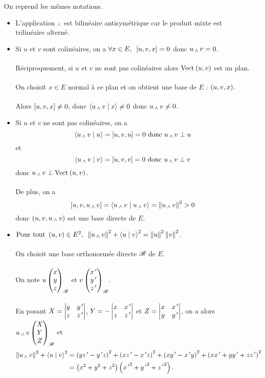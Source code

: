 \begin{dem}
On reprend les mêmes notations.

\begin{itemize}
    \item L'application \(\operatorname{_\wedge}\) est bilinéaire antisymétrique car le produit mixte est trilinéaire alterné. \\
    \item Si \(u\) et \(v\) sont colinéaires, on a \(\quantifs{\forall x\in E}\croch{u,v,x}=0\) donc \(u\operatorname{_\wedge} v=0\). \\\\ Réciproquement, si \(u\) et \(v\) ne sont pas colinéaires alors \(\Vect{u,v}\) est un plan. \\\\ On choisit \(x\in E\) normal à ce plan et on obtient une base de \(E\) : \(\left(u,v,x\right)\). \\\\ Alors \(\left[u,v,x\right]\not=0\), donc \(\ps{u\vecto v}{x}\not=0\) donc \(u\operatorname{_\wedge} v\not=0\). \\
    \item Si \(u\) et \(v\) ne sont pas colinéaires, on a \[\ps{u\vecto v}{u}=\croch{u,v,u}=0 \text{ donc } u\vecto v\perp u\] et \[\ps{u\vecto v}{v}=\croch{u,v,v}=0 \text{ donc }u\vecto v\perp v\] donc \(u\vecto v\perp\Vect{u,v}\). \\\\ De plus, on a \[\croch{u,v,u\vecto v}=\ps{u\vecto v}{u\vecto v}=\norme{u\vecto v}^2>0\] donc \(\left(u,v,u\operatorname{_\wedge} v\right)\) est une base directe de \(E\). \\
    \item \(\quantifs{\Tpt\paren{u,v}\in E^2}\norme{u\vecto v}^2+\ps{u}{v}^2=\norme{u}^2\norme{v}^2\). \\\\ On choisit une base orthonormée directe \(\mathscr{B}\) de \(E\). \\\\ On note \(u\begin{pmatrix}x\\y\\z\end{pmatrix}_{\mathscr{B}}\) et \(v\begin{pmatrix}x^{\,\prime}\\y^{\,\prime}\\z^{\,\prime}\end{pmatrix}_{\mathscr{B}}\). \\\\ En posant \(X=\begin{vmatrix}y & y^{\,\prime} \\ z & z^{\,\prime}\end{vmatrix}\), \(Y=-\begin{vmatrix}x & x^{\,\prime} \\ z & z^{\,\prime}\end{vmatrix}\) et \(Z=\begin{vmatrix}x & x^{\,\prime} \\ y & y^{\,\prime}\end{vmatrix}\), on a alors \(u\operatorname{_\wedge} v\begin{pmatrix}X\\Y\\Z\end{pmatrix}_{\mathscr{B}}\) et \[\begin{aligned}
    \norme{u\vecto v}^2+\ps{u}{v}^2&=\paren{yz\prim-y\prim z}^2+\paren{xz\prim-x\prim z}^2+\paren{xy\prim-x\prim y}^2+\paren{xx\prim+yy\prim+zz\prim}^2 \\
    &=\paren{x^2+y^2+z^2}\paren{{x\prim}^2+{y\prim}^2+{z\prim}^2}.
    \end{aligned}\]
\end{itemize}
\end{dem}

